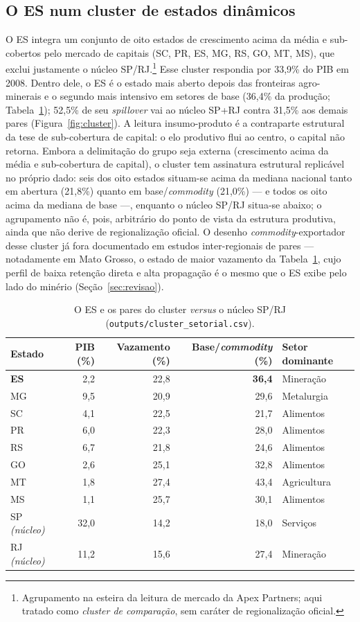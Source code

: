 \documentclass[11pt,a4paper]{article}
\begin{document}
\subsection{O ES num cluster de estados dinâmicos}
O ES integra um conjunto de oito estados de crescimento acima da média e
sub-cobertos pelo mercado de capitais (SC, PR, ES, MG, RS, GO, MT, MS), que
exclui justamente o núcleo SP/RJ.\footnote{Agrupamento na esteira da leitura
de mercado da Apex Partners; aqui tratado como \emph{cluster de comparação},
sem caráter de regionalização oficial.} Esse cluster respondia por 33,9\% do
PIB em 2008. Dentro dele, o ES é o estado mais aberto depois das fronteiras
agro-minerais e o segundo mais intensivo em setores de base (36,4\% da
produção; Tabela~\ref{tab:cluster}); 52,5\% de seu \emph{spillover} vai ao
núcleo SP+RJ contra 31,5\% aos demais pares (Figura~\ref{fig:cluster}). A
leitura insumo-produto é a contraparte estrutural da tese de sub-cobertura de
capital: o elo produtivo flui ao centro, o capital não retorna. Embora a
delimitação do grupo seja externa (crescimento acima da média e sub-cobertura de
capital), o cluster tem assinatura estrutural replicável no próprio dado: seis dos
oito estados situam-se acima da mediana nacional tanto em abertura (21,8\%) quanto em
base/\emph{commodity} (21,0\%) --- e todos os oito acima da mediana de base ---,
enquanto o núcleo SP/RJ situa-se abaixo; o agrupamento não é, pois, arbitrário do
ponto de vista da estrutura produtiva, ainda que não derive de regionalização oficial.
O desenho \emph{commodity}-exportador desse cluster já fora documentado em
estudos inter-regionais de pares --- notadamente em Mato Grosso, o estado de
maior vazamento da Tabela~\ref{tab:cluster}, cujo perfil de baixa retenção
direta e alta propagação \citep{figueiredo2004agriculture} é o mesmo que o ES
exibe pelo lado do minério (Seção~\ref{sec:revisao}).

\begin{table}[ht]
\centering
\begin{tabular}{lrrrl}
\toprule
Estado & PIB (\%) & Vazamento (\%) & Base/\emph{commodity} (\%) & Setor dominante\\
\midrule
\textbf{ES} & 2,2 & 22,8 & \textbf{36,4} & Mineração\\
MG & 9,5 & 20,9 & 29,6 & Metalurgia\\
SC & 4,1 & 22,5 & 21,7 & Alimentos\\
PR & 6,0 & 22,3 & 28,0 & Alimentos\\
RS & 6,7 & 21,8 & 24,6 & Alimentos\\
GO & 2,6 & 25,1 & 32,8 & Alimentos\\
MT & 1,8 & 27,4 & 43,4 & Agricultura\\
MS & 1,1 & 25,7 & 30,1 & Alimentos\\
\midrule
SP \emph{(núcleo)} & 32,0 & 14,2 & 18,0 & Serviços\\
RJ \emph{(núcleo)} & 11,2 & 15,6 & 27,4 & Mineração\\
\bottomrule
\end{tabular}
\caption{O ES e os pares do cluster \emph{versus} o núcleo SP/RJ
(\texttt{outputs/cluster\_setorial.csv}).}
\label{tab:cluster}
\end{table}
\end{document}
